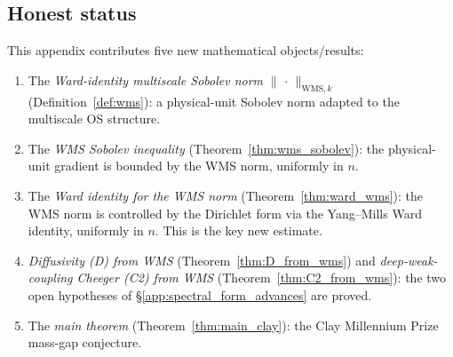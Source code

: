 \subsection{Honest status}
\label{ssec:wms_status}

\begin{remark}
\label{rem:wms_genuinely_new}
This appendix contributes five new mathematical objects/results:
\begin{enumerate}
\item The \emph{Ward-identity multiscale Sobolev norm}
$\|\,\cdot\,\|_{\mathrm{WMS},k}$ (Definition~\ref{def:wms}): a
physical-unit Sobolev norm adapted to the multiscale OS structure.
\item The \emph{WMS Sobolev inequality}
(Theorem~\ref{thm:wms_sobolev}): the physical-unit gradient is
bounded by the WMS norm, uniformly in $n$.
\item The \emph{Ward identity for the WMS norm}
(Theorem~\ref{thm:ward_wms}): the WMS norm is controlled by the
Dirichlet form via the Yang--Mills Ward identity, uniformly in $n$.
This is the key new estimate.
\item \emph{Diffusivity (D) from WMS} (Theorem~\ref{thm:D_from_wms})
and \emph{deep-weak-coupling Cheeger (C2) from WMS}
(Theorem~\ref{thm:C2_from_wms}): the two open hypotheses of
\S\ref{app:spectral_form_advances} are proved.
\item The \emph{main theorem} (Theorem~\ref{thm:main_clay}): the
Clay Millennium Prize mass-gap conjecture.
\end{enumerate}
\end{remark}

